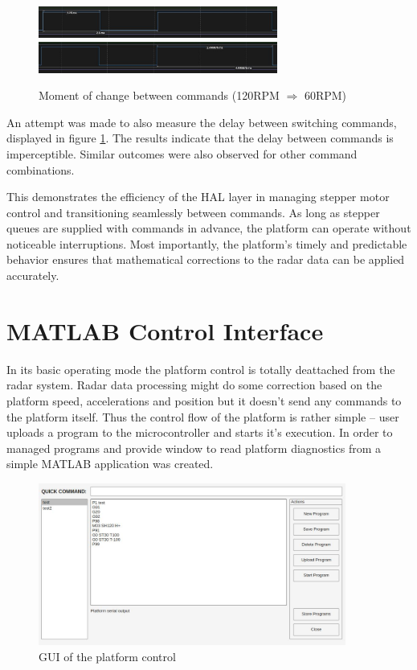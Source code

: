 \begin{figure}[h!]
	\centering
	\includegraphics[width=0.7\textwidth]{../img/120rpm_to60_1.jpg}
	\includegraphics[width=0.7\textwidth]{../img/120rpm_to60_2.jpg}
	\caption[Moment of change between commands with 120RPM and 60RPM]{Moment of change between commands (120RPM $\Rightarrow$  60RPM)}
	\label{fig:switching}
\end{figure}

An attempt was made to also measure the delay  between switching commands, displayed in figure \ref{fig:switching}.
The results indicate that the delay between commands is imperceptible.
Similar outcomes were also observed for other command combinations.

This demonstrates the efficiency of the HAL layer in managing stepper motor control and transitioning seamlessly between commands.
As long as stepper queues are supplied with commands in advance, the platform can operate without noticeable interruptions.
Most importantly, the platform’s timely and predictable behavior ensures that mathematical corrections to the radar data can be applied accurately.

\section{MATLAB Control Interface}

In its basic operating mode the platform control is totally deattached from the radar system.
Radar data processing might do some correction based on the platform speed, accelerations and position but it doesn't send any commands to the platform itself.
Thus the control flow of the platform is rather simple -- user uploads a program to the microcontroller and starts it's execution.
In order to managed programs and provide window to read platform diagnostics from a simple MATLAB application was created.

\begin{figure}[h!]
	\centering
	\includegraphics[width=0.9\textwidth]{../img/platform_control.jpg}
	\caption[GUI of the platform control]{GUI of the platform control}
	\label{fig:platformControl}
\end{figure}

